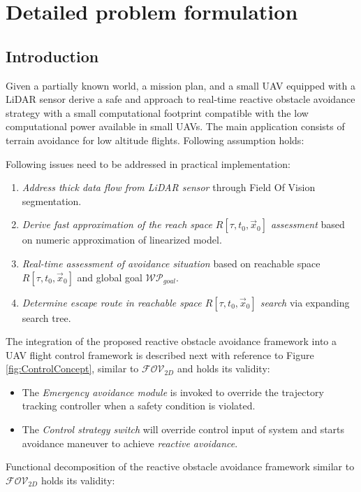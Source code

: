 \chapter {Detailed problem formulation}\label{ch:problemFormulation3D}
\section{Introduction}\noindent
Given a partially known world, a mission plan, and a small UAV equipped with a LiDAR sensor derive a safe and approach to real-time reactive obstacle avoidance strategy with a small computational footprint compatible with the low computational power available in small UAVs. The main application consists of terrain avoidance for low altitude flights. Following assumption holds:

\noindent
Following issues need to be addressed in practical implementation:
\begin{enumerate}
    \item \textit{Address thick data flow from LiDAR sensor} through Field Of Vision segmentation.
    \item \textit{Derive fast approximation of the reach space $R[\tau,t_0,\vec{x}_0]$ assessment} based on numeric approximation of linearized model.
    \item \textit{Real-time assessment of avoidance situation} based on reachable space $R[\tau,t_0,\vec{x}_0]$ and global goal $\mathscr{WP}_{goal}$.
    \item \textit{Determine escape route in reachable space $R[\tau,t_0,\vec{x}_0]$ search} via expanding search tree.
\end{enumerate}
\noindent
The integration of the proposed reactive obstacle avoidance framework into a UAV flight control framework is described next with reference to Figure \ref{fig:ControlConcept}, similar to $\mathscr{FOV}_{2D}$ and holds its validity:
\begin{itemize}
    \item The \textit{Emergency avoidance module} is invoked to override the trajectory tracking controller when a safety condition is violated.
    \item The \textit{Control strategy switch} will override control input of system and starts avoidance maneuver to achieve \textit{reactive avoidance}.
\end{itemize}
\newpage\noindent
Functional decomposition of the reactive obstacle avoidance framework similar to $\mathscr{FOV}_{2D}$ holds its validity:
